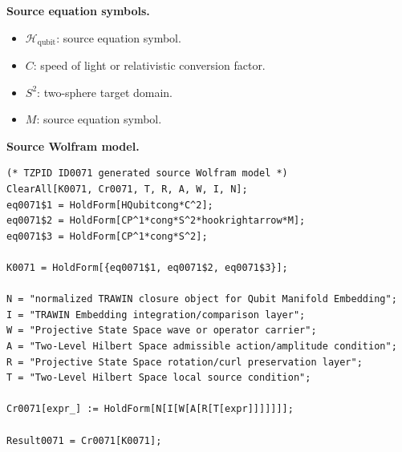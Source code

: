 \begin{minipage}[t]{0.49\linewidth}
\begingroup
\small
\raggedright
\textbf{Source equation symbols.}\par
\begin{itemize}[leftmargin=1.35em,itemsep=1pt,topsep=1pt,parsep=0pt]
    \item $\mathcal{H}_{\mathrm{qubit}}$: source equation symbol.
    \item $C$: speed of light or relativistic conversion factor.
    \item $S^{2}$: two-sphere target domain.
    \item $M$: source equation symbol.
\end{itemize}
\endgroup
\end{minipage}\hfill
\begin{minipage}[t]{0.47\linewidth}
\begingroup
\scriptsize
\raggedright
\textbf{Source Wolfram model.}\par
\begin{Verbatim}[fontsize=\tiny,breaklines=true,breakanywhere=true]
(* TZPID ID0071 generated source Wolfram model *)
ClearAll[K0071, Cr0071, T, R, A, W, I, N];
eq0071$1 = HoldForm[HQubitcong*C^2];
eq0071$2 = HoldForm[CP^1*cong*S^2*hookrightarrow*M];
eq0071$3 = HoldForm[CP^1*cong*S^2];

K0071 = HoldForm[{eq0071$1, eq0071$2, eq0071$3}];

N = "normalized TRAWIN closure object for Qubit Manifold Embedding";
I = "TRAWIN Embedding integration/comparison layer";
W = "Projective State Space wave or operator carrier";
A = "Two-Level Hilbert Space admissible action/amplitude condition";
R = "Projective State Space rotation/curl preservation layer";
T = "Two-Level Hilbert Space local source condition";

Cr0071[expr_] := HoldForm[N[I[W[A[R[T[expr]]]]]]];

Result0071 = Cr0071[K0071];
\end{Verbatim}
\endgroup
\end{minipage}

